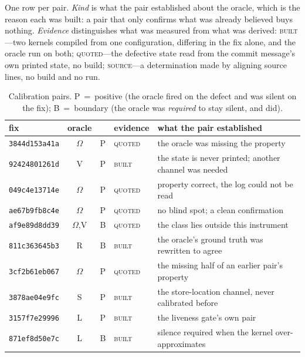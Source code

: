 One row per pair. \emph{Kind} is what the pair established about the oracle, which is
the reason each was built: a pair that only confirms what was already believed buys
nothing. \emph{Evidence} distinguishes what was measured from what was derived:
\textsc{built}---two kernels compiled from one configuration, differing in the fix
alone, and the oracle run on both; \textsc{quoted}---the defective state read from the
commit message's own printed state, no build; \textsc{source}---a determination made
by aligning source lines, no build and no run.

\begin{table}[H]
\caption{Calibration pairs. P~=~positive (the oracle fired on the defect and was
silent on the fix); B~=~boundary (the oracle was \emph{required} to stay silent, and
did).}
\label{tab:pairs}
\scriptsize
\setlength{\tabcolsep}{2.5pt}
\begin{tabular}{@{}l@{\hspace{4pt}}c@{\hspace{4pt}}c@{\hspace{4pt}}l@{\hspace{4pt}}p{}@{}}
\toprule
fix & oracle & & evidence & what the pair established \\
\midrule
\texttt{3844d153a41a} & $\Omega$ & P & \textsc{quoted} & the oracle was missing the property \\
\texttt{92424801261d} & V & P & \textsc{built} & the state is never printed; another channel was needed \\
\texttt{049c4e13714e} & $\Omega$ & P & \textsc{quoted} & property correct, the log could not be read \\
\texttt{ae67b9fb8c4e} & $\Omega$ & P & \textsc{quoted} & no blind spot; a clean confirmation \\
\texttt{af9e89d8dd39} & $\Omega$,V & B & \textsc{quoted} & the class lies outside this instrument \\
\texttt{811c363645b3} & R & B & \textsc{built} & the oracle's ground truth was rewritten to agree \\
\texttt{3cf2b61eb067} & $\Omega$ & P & \textsc{quoted} & the missing half of an earlier pair's property \\
\texttt{3878ae04e9fc} & S & P & \textsc{built} & the store-location channel, never calibrated before \\
\texttt{3157f7e29996} & L & P & \textsc{built} & the liveness gate's own pair \\
\texttt{871ef8d50e7c} & L & B & \textsc{built} & silence required when the kernel over-approximates \\

\end{tabular}
\end{table}
